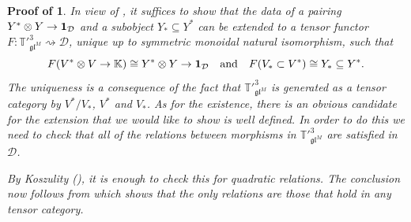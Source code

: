 \documentclass[11pt]{article}
\theoremstyle{plain}
\newtheorem{theorem}[lemma]{Theorem}
\theoremstyle{nonumberplain}
\theoremstyle{plain}
\theoremstyle{nonumberplain}
\newtheorem{proof_of_3d_univ}{Proof of \Cref{th.3d_univ}}
\newcommand\bK{{\mathbb K}}
\newcommand\bN{{\mathbb N}}
\newcommand\bT{{\mathbb T}}
\newcommand\cD{{\mathcal D}}
\newcommand\fgl{\mathfrak{gl}}
\newcommand{\qedhere}{\mbox{}\hfill\ensuremath{\blacksquare}}
\begin{document}
\begin{proof_of_3d_univ}
  In view of , it suffices to show that the data of a pairing $Y^*\otimes Y\to {\bf 1}_\cD$ and a subobject $Y_*\subseteq Y^*$ can be extended to a tensor functor $F:\bT'^3_{\fgl^M}\rightsquigarrow \cD$, unique up to symmetric monoidal natural isomorphism, such that
  \begin{equation*}
    F(V^*\otimes V\to \bK)\cong Y^*\otimes Y\to{\bf 1}_\cD\quad\text{and}\quad F(V_*\subset V^*)\cong Y_*\subseteq Y^*.
  \end{equation*}
The uniqueness is a consequence of the fact that $\bT'^3_{\fgl^M}$ is generated as a tensor category by $V^*/V_*$, $V^*$ and $V_*$. As for the existence, there is an obvious candidate for the extension that we would like to show is well defined. In order to do this we need to check that all of the relations between morphisms in $\bT'^3_{\fgl^M}$ are satisfied in $\cD$. 

By Koszulity (), it is enough to check this for quadratic relations. The conclusion now follows from  which shows that the only relations are those that hold in any tensor category. 
\end{proof_of_3d_univ}










%
%
%
%
%
%
%
%
%
%
%
%
\end{document}
